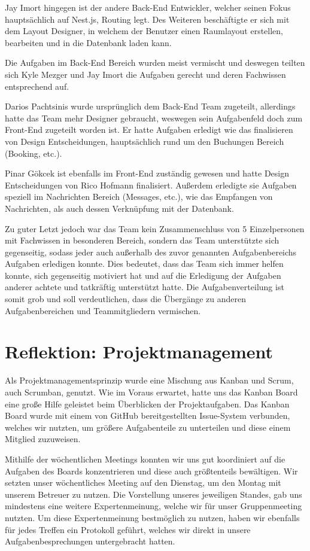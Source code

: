 Jay Imort hingegen ist der andere Back-End Entwickler, welcher seinen Fokus hauptsächlich auf Nest.js, Routing legt.
Des Weiteren beschäftigte er sich mit dem Layout Designer, in welchem der Benutzer einen Raumlayout erstellen, bearbeiten und in die Datenbank laden kann.

Die Aufgaben im Back-End Bereich wurden meist vermischt und deswegen teilten sich Kyle Mezger und Jay Imort die Aufgaben gerecht und deren Fachwissen entsprechend auf.

Darios Pachtsinis wurde ursprünglich dem Back-End Team zugeteilt, allerdings hatte das Team mehr Designer gebraucht, weswegen sein Aufgabenfeld doch zum Front-End zugeteilt worden ist.
Er hatte Aufgaben erledigt wie das finalisieren von Design Entscheidungen, hauptsächlich rund um den Buchungen Bereich (Booking, etc.).

Pinar Gökcek ist ebenfalls im Front-End zuständig gewesen und hatte Design Entscheidungen von Rico Hofmann finalisiert.
Außerdem erledigte sie Aufgaben speziell im Nachrichten Bereich (Messages, etc.), wie das Empfangen von Nachrichten, als auch dessen Verknüpfung mit der Datenbank.

Zu guter Letzt jedoch war das Team kein Zusammenschluss von 5 Einzelpersonen mit Fachwissen in besonderen Bereich, sondern das Team unterstützte sich gegenseitig, sodass jeder auch außerhalb des zuvor genannten Aufgabenbereichs Aufgaben erledigen konnte.
Dies bedeutet, dass das Team sich immer helfen konnte, sich gegenseitig motiviert hat und auf die Erledigung der Aufgaben anderer achtete und tatkräftig unterstützt hatte.
Die Aufgabenverteilung ist somit grob und soll verdeutlichen, dass die Übergänge zu anderen Aufgabenbereichen und Teammitgliedern vermischen.

\section{Reflektion: Projektmanagement}

Als Projektmanagementsprinzip wurde eine Mischung aus Kanban und Scrum, auch Scrumban, genutzt.
Wie im Voraus erwartet, hatte uns das Kanban Board eine große Hilfe geleistet beim Überblicken der Projektaufgaben.
Das Kanban Board wurde mit einem von GitHub bereitgestellten Issue-System verbunden, welches wir nutzten, um größere Aufgabenteile zu unterteilen und diese einem Mitglied zuzuweisen.

Mithilfe der wöchentlichen Meetings konnten wir uns gut koordiniert auf die Aufgaben des Boards konzentrieren und diese auch größtenteils bewältigen.
Wir setzten unser wöchentliches Meeting auf den Dienstag, um den Montag mit unserem Betreuer zu nutzen.
Die Vorstellung unseres jeweiligen Standes, gab uns mindestens eine weitere Expertenmeinung, welche wir für unser Gruppenmeeting nutzten.
Um diese Expertenmeinung bestmöglich zu nutzen, haben wir ebenfalls für jedes Treffen ein Protokoll geführt, welches wir direkt in unsere Aufgabenbesprechungen untergebracht hatten.


